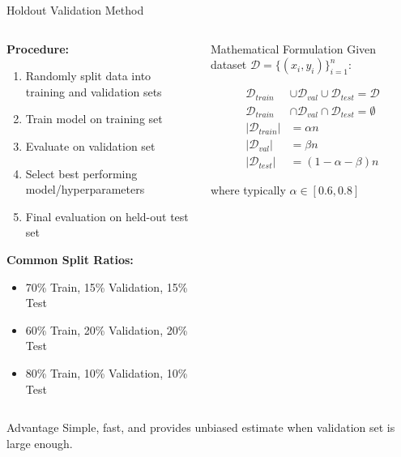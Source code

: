 \documentclass[8pt,aspectratio=1610]{beamer}
\begin{document}
\begin{frame}{Holdout Validation Method}
\begin{columns}[t]
\begin{column}{0.58\textwidth}
\textbf{Procedure:}
\begin{enumerate}
\setlength{\itemsep}{3pt}
\item Randomly split data into training and validation sets
\item Train model on training set
\item Evaluate on validation set
\item Select best performing model/hyperparameters
\item Final evaluation on held-out test set
\end{enumerate}

\vspace{0.3cm}

\textbf{Common Split Ratios:}
\begin{itemize}
\item 70\% Train, 15\% Validation, 15\% Test
\item 60\% Train, 20\% Validation, 20\% Test
\item 80\% Train, 10\% Validation, 10\% Test
\end{itemize}
\end{column}

\begin{column}{0.38\textwidth}
\begin{block}{Mathematical Formulation}
Given dataset $\mathcal{D} = \{(x_i, y_i)\}_{i=1}^n$:

\begin{align}
\mathcal{D}_{train} &\cup \mathcal{D}_{val} \cup \mathcal{D}_{test} = \mathcal{D} \\
\mathcal{D}_{train} &\cap \mathcal{D}_{val} \cap \mathcal{D}_{test} = \emptyset \\
|\mathcal{D}_{train}| &= \alpha n \\
|\mathcal{D}_{val}| &= \beta n \\
|\mathcal{D}_{test}| &= (1-\alpha-\beta) n
\end{align}

where typically $\alpha \in [0.6, 0.8]$
\end{block}
\end{column}
\end{columns}

\begin{alertblock}{Advantage}
Simple, fast, and provides unbiased estimate when validation set is large enough.
\end{alertblock}
\end{frame}
\end{document}
